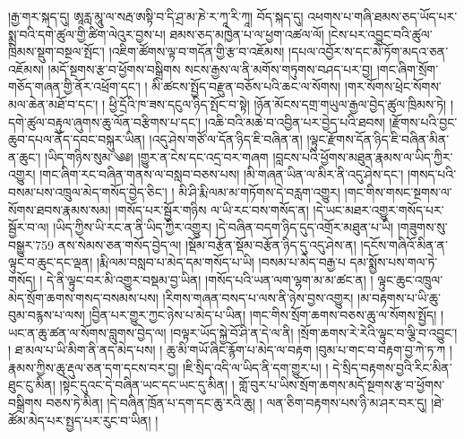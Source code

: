 \setcounter{footnote}{0} 
།རྒྱ་གར་སྐད་དུ། ཨཱརླ་མཱུ་ལ་སརྦ་ཨསྟི་བ་དི་ཤྲ་མ་ཎེ་ར་ཀཱ་རི་ཀཱ། བོད་སྐད་དུ། འཕགས་པ་གཞི་ཐམས་ཅད་ཡོད་པར་སྨྲ་བའི་དགེ་ཚུལ་གྱི་ཚིག་ལེའུར་བྱས་པ། ཐམས་ཅད་མཁྱེན་པ་ལ་ཕྱག་འཚལ་ལོ། །ངེས་པར་འབྱུང་བའི་ཚུལ་ཁྲིམས་སྡུག་བསྔལ་སྤོང་། །འཇིག་ཚོགས་ལྟ་བ་གདོན་གྱི་རྩ་བ་འཇོམས། །དཔལ་འབྱོར་ས་དང་མེ་ཏོག་མདའ་ཅན་འཇོམས། །མདོ་སྔགས་རྩ་བ་ཕྱོགས་བསྒྲིགས སངས་རྒྱས་ལ་ནི་མགོས་གཏུགས་བཤད་པར་བྱ། །གང་ཞིག་སྲོག་གཅོད་གཞན་གྱི་ནོར་འཕྲོག་དང་། ། མི་ཚངས་སྤྱོད་བརྫུན་བཅོས་པའི་ཆང་ལ་སོགས། །གར་སོགས་ཕྲེང་སོགས་མལ་ཆེན་མཐོ་བ་དང་། ། ཕྱི་དྲོའི་ཁ་ཟས་དངུལ་ཉིད་སྤོང་བ་སྟེ། །ཉོན་མོངས་དགྲ་གཡུལ་རྒྱལ་བྱེད་ཚུལ་ཁྲིམས་ཏེ། །དགེ་ཚུལ་བརྟུལ་ཞུགས་ཆུ་ལོན་བརྩིགས་པ་དང་། །འཆི་བའི་མཆེ་བ་འབྱིན་པར་བྱེད་པའི་ཐབས། །རྫོགས་པའི་བྱང་ཆུབ་དཔལ་ནོད་དབང་བསྐུར་ཡིན། །འདུ་ཤེས་གཙོ་ལ་དོན་ཉིད་ཇི་བཞིན་ན། །ལྟུང་རྫོགས་དོན་ཉིད་ཇི་བཞིན་མིན་ན་ཆུང་། །ཡིད་གཉིས་སུམ་༄༅། །གྱུར་ན་ངེས་དང་འདྲ་བར་གཞག །བླངས་པའི་ཕྱོགས་མཐུན་རྣམས་ལ་ཡིད་ཀྱིར་འགྱུར། །གང་ཞིག་རང་བཞིན་གནས་ལ་བསླབ་བཅས་པས། །མི་གཞན་ཡིན་ལ་མིར་ནི་འདུ་ཤེས་དང་། །གསད་པའི་བསམ་པས་འཁྲུལ་མེད་གསོད་བྱེད་ཅིང་། ། མི་ཤི་རྨི་ལམ་མ་གཏོགས་དེ་བརླག་འགྱུར། །གང་གིས་གསང་སྔགས་ལ་སོགས་ཐབས་རྣམས་སམ། །གསོད་པར་སྦྱོར་གཉིས ལ་ཡི་རང་བས་གསོད་ན། །དེ་ཡང་མཐར་འགྱུར་གསོད་པར་སྦྱོར་བ་ལ། །ཡིད་ཀྱིས་ཡི་རང་ན་ནི་ཡིད་ཀྱིར་འགྱུར། །དེ་བཞིན་བདག་ཉིད་དུད་འགྲོར་མཐུན་པ་ཡི། །གཟུགས་སུ་བསྒྱུར་759 ནས་སེམས་ཅན་གསོད་བྱེད་ལ། །སྡོམ་བརྩོན་སྡོམ་བརྩོན་ཉིད་དུ་འདུ་ཤེས་ན། །དངོས་གཞིའོ་མིན་ན་ལྟུང་བ་ཆུང་དང་ལྡན། །རྨི་ལམ་བསླབ་པ་མེད་དམ་གསོད་པ་ཡི། །བསམ་པ་མེད་བརྒྱ་པ དམ་སྨྱོས་པས་གལ་ཏེ་གསོད། ། དེ་ནི་ལྟུང་བར་མི་འགྱུར་བསྡམ་བྱ་ཡིན། །གསོད་པའི་ཡན་ལག་ལྷག་མ་མ་ཚང་ན། ། ལྟུང་ཆུང་འཁྲུལ་མེད་སྲོག་ཆགས་གསད་བསམས་པས། །རིགས་གཞན་བསད་པ་ལས་ནི་ཉེས་བྱས་འགྱུར། །མ་བརྟགས་པ་ཡི་ཆུ་བུམ་བརྙས་པ་ལས། །བྱིན་པར་གྱུར་ཀྱང་ཉེས་པ་མེད་པ་ཡིན། །གང་གིས་སྲོག་ཆགས་བཅས་ཆུ་ལ་སོགས་སྤྱོད། །ཡང་ན་ཆུ་ཚན་ལ་སོགས་བླུགས་བྱེད་ལ། །བལྟར་ཡོད་སྐྱེ་བོ་ཤི་ན་དེ་ལ་ནི། །སྲོག་ཆགས་རེ་རེའི་ལྟུང་བ་ལྕི་བ་འབྱུང་། ། ཐ་མལ་པ་ཡི་མིག་ནི་ནད་མེད་པས། ། ཆུ་མི་གཡོ་ཞིང་རྙོག་པ་མེད་ལ་བརྟག །བུམ་པ་གང་བ་བརྟག་བྱ་ཀེ་ཏ་ཀ །རྣམས་ཀྱིས་ཆུ་རྡུལ་ཅན་དག་དངས་བར་བྱ། །ཇི་སྲིད་འདི་ལ་ཡིད་ནི་དག་གྱུར་པ། ། དེ་སྲིད་བརྟགས་བྱའི་རིང་མིན་ཐུང་ངུ་མིན། །སྟེང་དུའང་དེ་བཞིན་ཡང་དང་ཡང་དུ་མིན། ། གློ་བུར་པ་ཡིས་སྲོག་ཆགས་མདོ་སྔགས་རྩ་བ་ཕྱོགས་བསྒྲིགས བཅས་ཏེ་མིན། །དེ་བཞིན་ཁྲོན་པ་དག་དང་ཆུ་རའི་ཆུ། ། ལན་ཅིག་བརྟགས་པས་ཉི་མ་ཤར་བར་དུ། །ཐེ་ཚོམ་མེད་པར་སྤྱད་པར་རུང་བ་ཡིན། །
